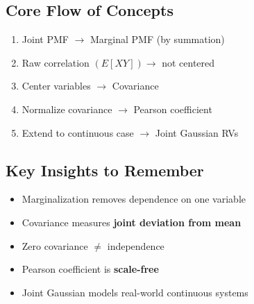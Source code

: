 \documentclass[12pt]{article}
\begin{document}
\subsection*{Core Flow of Concepts}

\begin{enumerate}
\item Joint PMF $\rightarrow$ Marginal PMF (by summation)
\item Raw correlation $(E[XY]) \rightarrow$ not centered
\item Center variables $\rightarrow$ Covariance
\item Normalize covariance $\rightarrow$ Pearson coefficient
\item Extend to continuous case $\rightarrow$ Joint Gaussian RVs
\end{enumerate}

\subsection*{Key Insights to Remember}

\begin{itemize}
\item Marginalization removes dependence on one variable
\item Covariance measures \textbf{joint deviation from mean}
\item Zero covariance $\neq$ independence
\item Pearson coefficient is \textbf{scale-free}
\item Joint Gaussian models real-world continuous systems
\end{itemize}
\end{document}
